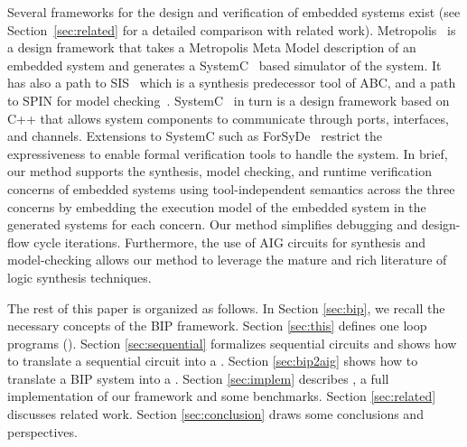 Several frameworks for the design and verification of embedded systems exist 
(see Section~\ref{sec:related} for a detailed comparison with related work).
%
Metropolis~\cite{metropolis1,metropolis2} is a design framework that
takes a Metropolis Meta Model description of an embedded system 
and generates a SystemC~\cite{systemc} based simulator of the system.
It has also a path to SIS~\cite{brayton92sis} which is a synthesis predecessor tool 
of ABC, and a path to SPIN for model checking~\cite{HolzSpin97}. 
SystemC~\cite{systemc} in turn is a design framework based on C++ that allows
system components to communicate through ports, interfaces, and channels.
Extensions to SystemC such as ForSyDe~\cite{SanderJ04} restrict the 
expressiveness to enable formal verification tools to handle the system. 
In brief, our method supports the synthesis, model checking, and runtime verification 
concerns of embedded systems using tool-independent semantics across the three concerns
by embedding the execution model of the embedded system in the generated systems 
for each concern. 
Our method simplifies debugging and design-flow cycle iterations. Furthermore, 
the use of AIG circuits for synthesis and model-checking allows our method to leverage
the mature and rich literature of logic synthesis techniques. 

The rest of this paper is organized as follows. In Section \ref{sec:bip}, we recall the necessary concepts of the BIP framework. Section \ref{sec:this} defines one loop programs (\caig). Section \ref{sec:sequential} formalizes sequential circuits and shows how to translate a sequential circuit into a \caig. Section \ref{sec:bip2aig} shows how to translate a BIP system into a \caig. Section \ref{sec:implem}
describes \biptool{}, a full implementation of our framework and some benchmarks. Section \ref{sec:related} discusses related work. Section \ref{sec:conclusion} draws some conclusions and perspectives.

